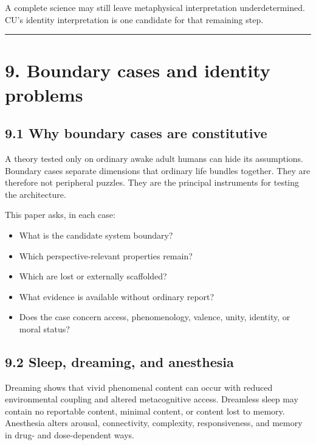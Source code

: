\documentclass[
  11pt,
]{article}
\providecommand{\tightlist}{%
  \setlength{\itemsep}{0pt}\setlength{\parskip}{0pt}}
\begin{document}
A complete science may still leave metaphysical interpretation
underdetermined. CU's identity interpretation is one candidate for that
remaining step.

\begin{center}\rule{0.5\linewidth}{0.5pt}\end{center}

\section{9. Boundary cases and identity
problems}\label{boundary-cases-and-identity-problems}

\subsection{9.1 Why boundary cases are
constitutive}\label{why-boundary-cases-are-constitutive}

A theory tested only on ordinary awake adult humans can hide its
assumptions. Boundary cases separate dimensions that ordinary life
bundles together. They are therefore not peripheral puzzles. They are
the principal instruments for testing the architecture.

This paper asks, in each case:

\begin{itemize}
\tightlist
\item
  What is the candidate system boundary?
\item
  Which perspective-relevant properties remain?
\item
  Which are lost or externally scaffolded?
\item
  What evidence is available without ordinary report?
\item
  Does the case concern access, phenomenology, valence, unity, identity,
  or moral status?
\end{itemize}

\subsection{9.2 Sleep, dreaming, and
anesthesia}\label{sleep-dreaming-and-anesthesia}

Dreaming shows that vivid phenomenal content can occur with reduced
environmental coupling and altered metacognitive access. Dreamless sleep
may contain no reportable content, minimal content, or content lost to
memory. Anesthesia alters arousal, connectivity, complexity,
responsiveness, and memory in drug- and dose-dependent ways.
\end{document}
